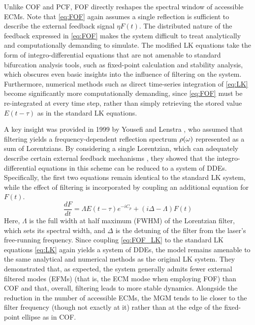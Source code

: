 Unlike COF and PCF, FOF directly reshapes the spectral window of accessible ECMs.
Note that \eqref{eq:FOF} again assumes a single reflection is sufficient to describe the external feedback signal $\eta F(t)$.
The distributed nature of the feedback expressed in \eqref{eq:FOF} makes the system difficult to treat analytically and computationally demanding to simulate.
The modified LK equations take the form of integro-differential equations that are not amenable to standard bifurcation analysis tools, such as fixed-point calculation and stability analysis, which obscures even basic insights into the influence of filtering on the system.
Furthermore, numerical methods such as direct time-series integration of \eqref{eq:LK} become significantly more computationally demanding, since \eqref{eq:FOF} must be re-integrated at every time step, rather than simply retrieving the stored value $E(t-\tau)$ as in the standard LK equations.
%
\par
%
A key insight was provided in 1999 by Yousefi and Lenstra \cite{yousefi1999dynamical}, who assumed that filtering yields a frequency-dependent reflection spectrum $\rho(\omega)$ represented as a sum of Lorentzians.
By considering a single Lorentzian, which can adequately describe certain external feedback mechanisms \cite{dahmani1987frequency,detienne1997semiconductor}, they showed that the integro-differential equations in this scheme can be reduced to a system of DDEs.
Specifically, the first two equations remain identical to the standard LK system, while the effect of filtering is incorporated by coupling an additional equation for $F(t)$.
%
\begin{equation}
\label{eq:FOF_LK}
    \frac{d F}{d t} = \Lambda E(t-\tau) e^{-i C_p}+(i \Delta-\Lambda) F(t)
\end{equation}
%
Here, $\Lambda$ is the full width at half maximum (FWHM) of the Lorentzian filter, which sets its spectral width, and $\Delta$ is the detuning of the filter from the laser’s free-running frequency.
Since coupling \eqref{eq:FOF_LK} to the standard LK equations \eqref{eq:LK} again yields a system of DDEs, the model remains amenable to the same analytical and numerical methods as the original LK system.
They demonstrated that, as expected, the system generally admits fewer external filtered modes (EFMs) (that is, the ECM modse when employing FOF) than COF and that, overall, filtering leads to more stable dynamics.
Alongside the reduction in the number of accessible ECMs, the MGM tends to lie closer to the filter frequency (though not exactly at it) rather than at the edge of the fixed-point ellipse as in COF.
